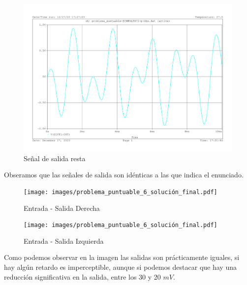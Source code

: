 {      \begin{figure}[H]
    \centering  
    \includegraphics[scale=0.5,page=1]{images/problema_puntuable_6_suma_resta_individual.pdf}
    \caption{Señal de salida resta}
  \end{figure}

  Obseramos que las señales de salida son idénticas a las que indica
  el enunciado.
  
  \begin{figure}[H]
    \centering  
    \texttt{[image: images/problema\_puntuable\_6\_solución\_final.pdf]}
    \caption{Entrada - Salida Derecha}
  \end{figure}

      \begin{figure}[H]
    \centering  
    \texttt{[image: images/problema\_puntuable\_6\_solución\_final.pdf]}
    \caption{Entrada - Salida Izquierda}
  \end{figure}


  Como podemos observar en la imagen las salidas son prácticamente
  iguales, si hay algún retardo es imperceptible, aunque si podemos
  destacar que hay una reducción significativa en la salida, entre los
  30 y 20 $mV$.
}

